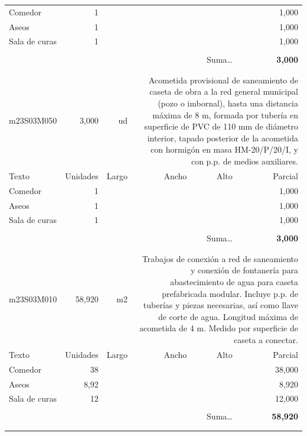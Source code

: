 \documentclass{book}%
\begin{document}
\begin{longtable}{lrrrrr}
\hline%
\multicolumn{1}{p{3.5cm}}{Comedor}&1&&&&     1,000\\%
\multicolumn{1}{p{3.5cm}}{Aseos}&1&&&&     1,000\\%
\multicolumn{1}{p{3.5cm}}{Sala de curas}&1&&&&     1,000\\%
&&&&&\\%
\multicolumn{5}{r}{Suma\ldots}&\textbf{     3,000}\\%
\hline%
&&&&&\\%
&&&&&\\%
m23S03M050&     3,000& ud&\multicolumn{3}{p{6cm}}{\scriptsize Acometida provisional de saneamiento de caseta de obra a la red general municipal (pozo o imbornal), hasta una distancia máxima de 8 m, formada por tubería en superficie de PVC de 110 mm de diámetro interior, tapado posterior de la acometida con hormigón en masa HM-20/P/20/I, y con p.p. de medios auxiliares.\normalsize}\\%
Texto&Unidades&Largo&Ancho&Alto&Parcial\\%
\hline%
\multicolumn{1}{p{3.5cm}}{Comedor}&1&&&&     1,000\\%
\multicolumn{1}{p{3.5cm}}{Aseos}&1&&&&     1,000\\%
\multicolumn{1}{p{3.5cm}}{Sala de curas}&1&&&&     1,000\\%
&&&&&\\%
\multicolumn{5}{r}{Suma\ldots}&\textbf{     3,000}\\%
\hline%
&&&&&\\%
&&&&&\\%
m23S03M010&    58,920& m2&\multicolumn{3}{p{6cm}}{\scriptsize Trabajos de conexión a red de saneamiento y conexión de fontanería para abastecimiento de agua para caseta prefabricada modular. Incluye p.p. de tuberías y piezas necesarias, así como llave de corte de agua. Longitud máxima de acometida de 4 m. Medido por superficie de caseta a conectar.\normalsize}\\%
Texto&Unidades&Largo&Ancho&Alto&Parcial\\%
\hline%
\multicolumn{1}{p{3.5cm}}{Comedor}&38&&&&    38,000\\%
\multicolumn{1}{p{3.5cm}}{Aseos}&8,92&&&&     8,920\\%
\multicolumn{1}{p{3.5cm}}{Sala de curas}&12&&&&    12,000\\%
&&&&&\\%
\multicolumn{5}{r}{Suma\ldots}&\textbf{    58,920}\\%
\hline%
&&&&&\\%
&&&&&\\%

\end{longtable}
\end{document}
